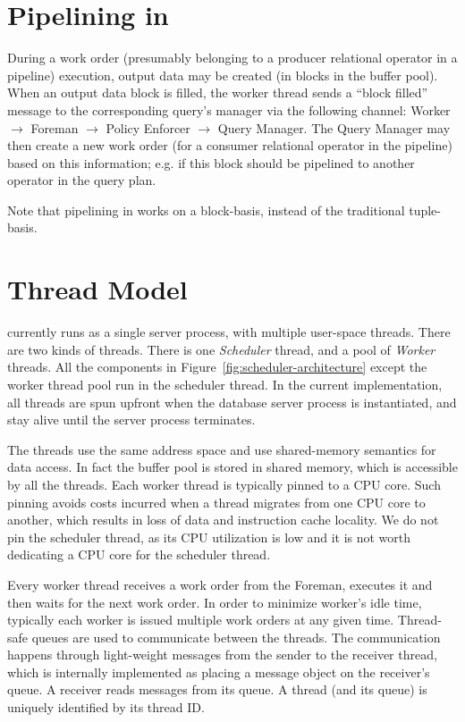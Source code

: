 \section{Pipelining in \sys{}}\label{apx:pipelining}
During a work order (presumably belonging to a producer relational operator in a pipeline) execution, output data may be created (in blocks in the buffer pool). 
When an output data block is filled, the worker thread sends a ``block filled'' message to the corresponding query's manager via the following channel: Worker $\rightarrow$ Foreman $\rightarrow$ Policy Enforcer $\rightarrow$ Query Manager.
The Query Manager may then create a new work order (for a consumer relational operator in the pipeline) based on this information;
e.g. if this block should be pipelined to another operator in the query plan.

Note that pipelining in \sys{} works on a block-basis, instead of the traditional tuple-basis.

\section{Thread Model}\label{apx:thread}
\sys{} currently runs as a single server process, with multiple user-space threads. 
There are two kinds of threads. 
There is one \textit{Scheduler} thread, and a pool of \textit{Worker} threads. 
All the components in 
Figure~\ref{fig:scheduler-architecture} except the worker thread pool run in the 
scheduler thread. 
In the current implementation, all threads are spun upfront when the database server 
process is instantiated, and stay alive until the server process terminates.

The threads use the same address space and use shared-memory semantics for data 
access. 
In fact the buffer pool is stored in shared memory, which is accessible by all the threads. 
Each worker thread is typically pinned to a CPU core. 
Such pinning avoids costs incurred when a thread migrates from one CPU core to another, which results in loss of data and instruction cache locality. 
We do not pin the scheduler thread, as its CPU utilization is low and it is not worth dedicating a CPU core for the scheduler thread.

Every worker thread receives a work order from the Foreman, executes it and then waits for the next work order.
In order to minimize worker's idle time, typically each worker is issued multiple work 
orders at any given time. 
Thread-safe queues are used to communicate between the threads.
The communication happens through light-weight messages from the sender to the receiver thread, which is internally implemented as placing a message object on the receiver's queue. 
A receiver reads messages from its queue. 
A thread (and its queue) is uniquely identified by its thread ID. 

